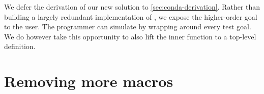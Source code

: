 \documentclass[runningheads,natbib=false]{llncs}
\begin{document}


We defer the derivation of our new  solution to
\cref{sec:conda-derivation}. Rather than building a largely redundant
implementation of , we expose the higher-order goal
 to the user. The programmer can simulate
 by wrapping  around every test
goal. We do however take this opportunity to also lift the inner
function  to a top-level definition.






\section{Removing more macros}\label{sec:functional}
\end{document}
